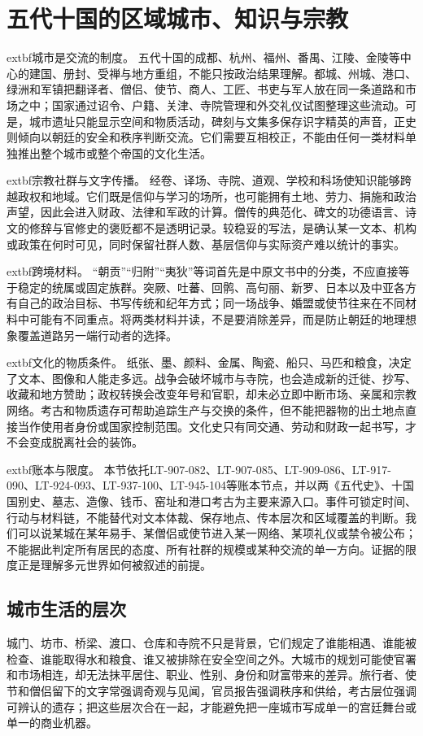 \section{五代十国的区域城市、知识与宗教}
\label{sec:regional-cities-knowledge-religion}

\noindent	extbf{城市是交流的制度。} 五代十国的成都、杭州、福州、番禺、江陵、金陵等中心的建国、册封、受禅与地方重组，不能只按政治结果理解。都城、州城、港口、绿洲和军镇把翻译者、僧侣、使节、商人、工匠、书吏与军人放在同一条道路和市场之中；国家通过诏令、户籍、关津、寺院管理和外交礼仪试图整理这些流动。可是，城市遗址只能显示空间和物质活动，碑刻与文集多保存识字精英的声音，正史则倾向以朝廷的安全和秩序判断交流。它们需要互相校正，不能由任何一类材料单独推出整个城市或整个帝国的文化生活。

\noindent	extbf{宗教社群与文字传播。} 经卷、译场、寺院、道观、学校和科场使知识能够跨越政权和地域。它们既是信仰与学习的场所，也可能拥有土地、劳力、捐施和政治声望，因此会进入财政、法律和军政的计算。僧传的典范化、碑文的功德语言、诗文的修辞与官修史的褒贬都不是透明记录。较稳妥的写法，是确认某一文本、机构或政策在何时可见，同时保留社群人数、基层信仰与实际资产难以统计的事实。

\noindent	extbf{跨境材料。} “朝贡”“归附”“夷狄”等词首先是中原文书中的分类，不应直接等于稳定的统属或固定族群。突厥、吐蕃、回鹘、高句丽、新罗、日本以及中亚各方有自己的政治目标、书写传统和纪年方式；同一场战争、婚盟或使节往来在不同材料中可能有不同重点。将两类材料并读，不是要消除差异，而是防止朝廷的地理想象覆盖道路另一端行动者的选择。

\noindent	extbf{文化的物质条件。} 纸张、墨、颜料、金属、陶瓷、船只、马匹和粮食，决定了文本、图像和人能走多远。战争会破坏城市与寺院，也会造成新的迁徙、抄写、收藏和地方赞助；政权转换会改变年号和官职，却未必立即中断市场、亲属和宗教网络。考古和物质遗存可帮助追踪生产与交换的条件，但不能把器物的出土地点直接当作使用者身份或国家控制范围。文化史只有同交通、劳动和财政一起书写，才不会变成脱离社会的装饰。

\noindent	extbf{账本与限度。} 本节依托LT-907-082、LT-907-085、LT-909-086、LT-917-090、LT-924-093、LT-937-100、LT-945-104等账本节点，并以两《五代史》、十国国别史、墓志、造像、钱币、窑址和港口考古为主要来源入口。事件可锁定时间、行动与材料链，不能替代对文本体裁、保存地点、传本层次和区域覆盖的判断。我们可以说某城在某年易手、某僧侣或使节进入某一网络、某项礼仪或禁令被公布；不能据此判定所有居民的态度、所有社群的规模或某种交流的单一方向。证据的限度正是理解多元世界如何被叙述的前提。

\subsection{城市生活的层次}
城门、坊市、桥梁、渡口、仓库和寺院不只是背景，它们规定了谁能相遇、谁能被检查、谁能取得水和粮食、谁又被排除在安全空间之外。大城市的规划可能使官署和市场相连，却无法抹平居住、职业、性别、身份和财富带来的差异。旅行者、使节和僧侣留下的文字常强调奇观与见闻，官员报告强调秩序和供给，考古层位强调可辨认的遗存；把这些层次合在一起，才能避免把一座城市写成单一的宫廷舞台或单一的商业机器。


